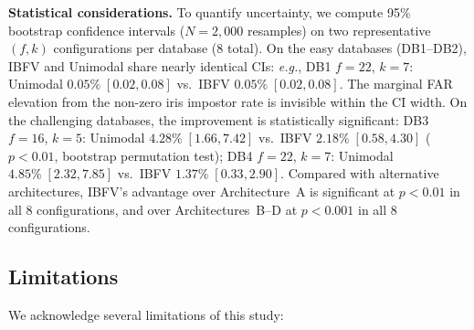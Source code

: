 \documentclass[3p,twocolumn]{elsarticle}
\newcommand{\IBFV}{\textsf{IBFV}}
\newcommand{\eg}{\textit{e.g.}}
\begin{document}
\textbf{Statistical considerations.} To quantify uncertainty, we compute 95\% bootstrap confidence intervals ($N = 2{,}000$ resamples) on two representative $(f, k)$ configurations per database (8 total). On the easy databases (DB1--DB2), \IBFV{} and Unimodal share nearly identical CIs: \eg{}, DB1 $f{=}22$, $k{=}7$: Unimodal $0.05\%\;[0.02, 0.08]$ vs.\ \IBFV{} $0.05\%\;[0.02, 0.08]$. The marginal FAR elevation from the non-zero iris impostor rate is invisible within the CI width. On the challenging databases, the improvement is statistically significant: DB3 $f{=}16$, $k{=}5$: Unimodal $4.28\%\;[1.66, 7.42]$ vs.\ \IBFV{} $2.18\%\;[0.58, 4.30]$ ($p < 0.01$, bootstrap permutation test); DB4 $f{=}22$, $k{=}7$: Unimodal $4.85\%\;[2.32, 7.85]$ vs.\ \IBFV{} $1.37\%\;[0.33, 2.90]$. Compared with alternative architectures, \IBFV{}'s advantage over Architecture~A is significant at $p < 0.01$ in all 8 configurations, and over Architectures~B--D at $p < 0.001$ in all 8 configurations.

\subsection{Limitations}
\label{sec:limitations}

We acknowledge several limitations of this study:
\end{document}
